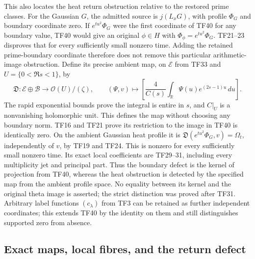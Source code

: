 \documentclass[
  10pt,
  a4paper,
]{article}
\begin{document}
This also locates the heat return obstruction relative to the restored
prime classes. For the Gaussian \(G\), the admitted source is
\(j(L_xG)\), with profile \(\Phi_G\) and boundary coordinate zero. If
\(e^{tu^2}\Phi_G\) were the first coordinate of TF40 for any boundary
value, TF40 would give an original \(\phi\in H\) with
\(\Phi_\phi=e^{tu^2}\Phi_G\). TF21--23 disproves that for every
sufficiently small nonzero time. Adding the retained prime-boundary
coordinate therefore does not remove this particular arithmetic-image
obstruction. Define its precise ambient map, on \(\mathscr E\) from TF33
and \(U=\{0<\Re s<1\}\), by \[
\mathfrak D:\mathscr E\oplus\mathcal B\longrightarrow\mathcal O(U)/(\zeta),
\qquad
(\Psi,v)\longmapsto
\left[\frac4{C(s)}\int_{\mathbb R}\Psi(u)e^{(2s-1)u}\,du\right].
\tag{TF42}
\] The rapid exponential bounds prove the integral is entire in \(s\),
and \(C|_U\) is a nonvanishing holomorphic unit. This defines the map
without choosing any boundary norm. TF16 and TF21 prove its restriction
to the image in TF40 is identically zero. On the ambient Gaussian heat
profile it is \(\mathfrak D(e^{tu^2}\Phi_G,v)=\Omega_t\), independently
of \(v\), by TF19 and TF24. This is nonzero for every sufficiently small
nonzero time. Its exact local coefficients are TF29--31, including every
multiplicity jet and principal part. Thus the boundary defect is the
kernel of projection from TF40, whereas the heat obstruction is detected
by the specified map from the ambient profile space. No equality between
its kernel and the original theta image is asserted; the strict
distinction was proved after TF31. Arbitrary label functions
\((c_\lambda)\) from TF3 can be retained as further independent
coordinates; this extends TF40 by the identity on them and still
distinguishes supported zero from absence.

\subsection{Exact maps, local fibres, and the return
defect}\label{exact-maps-local-fibres-and-the-return-defect}
\end{document}
